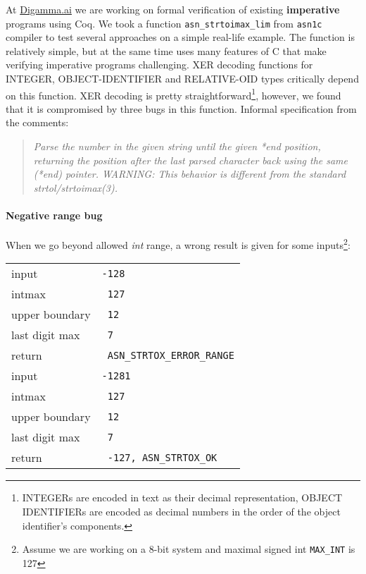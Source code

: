 \documentclass[acmsmall,nonacm]{acmart}
\begin{document}
  At \url{Digamma.ai} we are working on formal verification of existing {\bf imperative} programs using Coq. We took a function \texttt{asn\_strtoimax\_lim} from \texttt{asn1c} compiler to test several approaches on a simple real-life example. The function is relatively simple, but at the same time uses many features of C that make verifying imperative programs challenging. XER decoding functions for INTEGER, OBJECT-IDENTIFIER and RELATIVE-OID types critically depend on this function. XER decoding is pretty straightforward\footnote{INTEGERs are encoded in text as their decimal representation, OBJECT IDENTIFIERs are encoded as decimal numbers in the order of the object identifier's components.}, however, we found that it is compromised by three bugs in this function.
    Informal specification from the comments: 
  \begin{quote}

 { \it Parse the number in the given string until the given *end position,
 returning the position after the last parsed character back using the
 same (*end) pointer.
 WARNING: This behavior is different from the standard strtol/strtoimax(3). }
\end{quote}
  
  
\paragraph{Negative range bug}

When we go beyond allowed \textit{int} range, a wrong result is given for some inputs\footnote{Assume we are working on a 8-bit system and maximal signed int \texttt{MAX\_INT} is 127}:

\begin{tabular}{|l|l|}
 \hline
input & \texttt{-128} \\
intmax & \texttt{\ 127}\\
upper boundary& \texttt{\ 12} \\
last digit max& \texttt{\ 7}\\
return & \color{green}\texttt{\ ASN\_STRTOX\_ERROR\_RANGE}\\
\hline 
input & \texttt{-1281} \\
intmax & \texttt{\ 127}\\
upper boundary& \texttt{\ 12} \\
last digit max& \texttt{\ 7}\\
return & \color{red}\texttt{\ -127, ASN\_STRTOX\_OK}\\
\hline
    \end{tabular}
\end{document}
